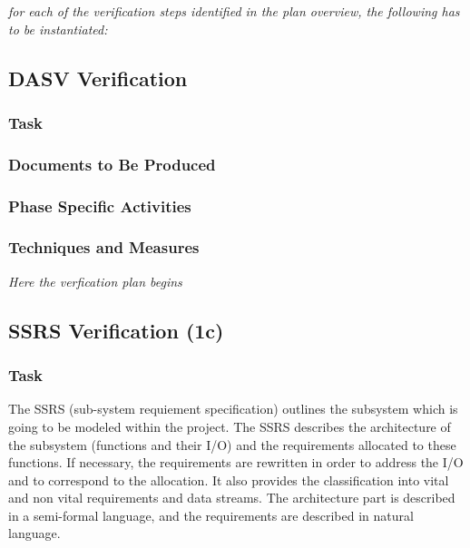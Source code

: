 \documentclass{template/openetcs_report}
\begin{document}
\textit{for each of the verification steps identified in the plan
  overview, the following has to be instantiated: }
\subsection{DASV Verification}
\label{sec:dasv-verification}

\subsubsection{Task}
\label{sec:dasv-verif-task}

\subsubsection{Documents to Be Produced}
\label{sec:dasv-verif-docum-be-prod}

\subsubsection{Phase Specific Activities}
\label{sec:dasv-verif-phase-spec-activ}

\subsubsection{Techniques and Measures}
\label{sec:dasv-verif-techniques-measures}

\textit{Here the verfication plan begins}

\subsection{SSRS Verification (1c)}
\label{sec:ssrs-verification}

\subsubsection{Task}
\label{sec:ssrs-verif-task}

The SSRS (sub-system requiement specification) outlines the subsystem
which is going to be modeled within the project. The SSRS describes
the architecture of the subsystem (functions and their I/O) and the
requirements allocated to these functions. If necessary, the
requirements are rewritten in order to address the I/O and to
correspond to the allocation. It also provides the classification into
vital and non vital requirements and data
streams. The architecture part is described in a semi-formal language,
and the requirements are described in natural language.
\end{document}
